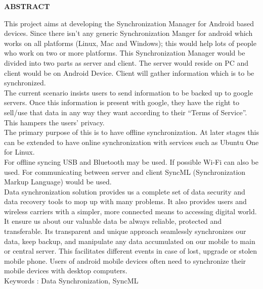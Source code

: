 \begin{center}
\thispagestyle{empty}
\vspace{2cm}
\LARGE{\textbf{ABSTRACT}}\\[1.0cm]
\end{center}
\thispagestyle{empty}
\hspace*{1.5cm}\large{This project aims at developing the Synchronization Manager for Android based devices. 
Since there isn't any generic Synchronization Manger for android which works on all platforms (Linux, Mac and Windows); 
this would help lots of people who work on two or more platforms. This Synchronization Manager would be divided into two 
parts as server and client.  The server would reside on PC and client would be on Android Device. Client will gather 
information which is to be synchronized.\\[0.3cm]}
\hspace*{1.5cm}\large{The current scenario insists users to send information to be backed up to google servers. 
Once this information is present with google, they have the right to sell/use that data in any way they want 
according to their “Terms of Service”. This hampers the users’ privacy.\\[0.3cm]}
\hspace*{1.5cm}\large{The primary purpose of this is to have offline synchronization. 
At later stages this can be extended to have online synchronization with services such as Ubuntu One for Linux.\\[0.3cm]}
\hspace*{1.5cm}\large{For offline syncing USB and Bluetooth may be used. If possible Wi-Fi can also be used. 
For communicating between server and client SyncML (Synchronization Markup Language) would be used.\\[0.3cm]}
\hspace*{1.5cm}\large{Data synchronization solution provides us a complete set of data security and data 
recovery tools to mop up with many problems. It also provides users and wireless carriers with a simpler, 
more connected means to accessing digital world.\\[0.3cm]}
\hspace*{1.5cm}\large{It ensure us about our valuable data be always reliable, protected and transferable. 
Its transparent and unique approach seamlessly synchronizes our data, keep backup, and manipulate any 
data accumulated on our mobile to main or central server. This facilitates different events in case of 
lost, upgrade or stolen mobile phone. Users of android mobile devices often need to synchronize their 
mobile devices with desktop computers.\\[0.3cm]}
Keywords : Data Synchronization, SyncML